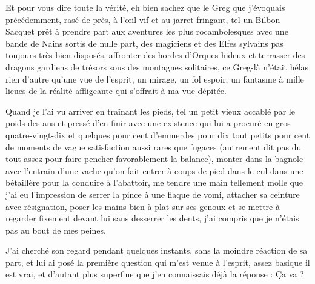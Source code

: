 Et pour vous dire toute la vérité, eh bien sachez que le Greg que j’évoquais précédemment, rasé de près, à l’œil vif et au jarret fringant, tel un Bilbon Sacquet prêt à prendre part aux aventures les plus rocambolesques avec une bande de Nains sortis de nulle part, des magiciens et des Elfes sylvains pas toujours très bien disposés, affronter des hordes d’Orques hideux et terrasser des dragons gardiens de trésors sous des montagnes solitaires, ce Greg-là n’était hélas rien d’autre qu’une vue de l’esprit, un mirage, un fol espoir, un fantasme à mille lieues de la réalité affligeante qui s’offrait à ma vue dépitée.

Quand je l’ai vu arriver en traînant les pieds, tel un petit vieux accablé par le poids des ans et pressé d’en finir avec une existence qui lui a procuré en gros quatre-vingt-dix et quelques pour cent d’emmerdes pour dix tout petits pour cent de moments de vague satisfaction aussi rares que fugaces (autrement dit pas du tout assez pour faire pencher favorablement la balance), monter dans la bagnole avec l’entrain d’une vache qu’on fait entrer à coups de pied dans le cul dans une bétaillère pour la conduire à l’abattoir, me tendre une main tellement molle que j’ai eu l’impression de serrer la pince à une flaque de vomi, attacher sa ceinture avec résignation, poser les mains bien à plat sur ses genoux et se mettre à regarder fixement devant lui sans desserrer les dents, j’ai compris que je n’étais pas au bout de mes peines.

J’ai cherché son regard pendant quelques instants, sans la moindre réaction de sa part, et lui ai posé la première question qui m’est venue à l’esprit, assez basique il est vrai, et d’autant plus superflue que j’en connaissais déjà la réponse : Ça va ?

